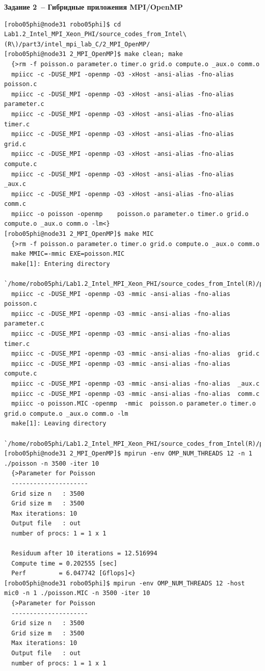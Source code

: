 \documentclass[pscyr,10pt]{hedlab}
\begin{document}
  \begin{center}
    \textbf{Задание 2~-- Гибридные приложения MPI/OpenMP}
  \end{center}

\begin{lstlisting}
[robo05phi@node31 robo05phi]$ cd Lab1.2_Intel_MPI_Xeon_PHI/source_codes_from_Intel\(R\)/part3/intel_mpi_lab_C/2_MPI_OpenMP/
[robo05phi@node31 2_MPI_OpenMP]$ make clean; make
  {>rm -f poisson.o parameter.o timer.o grid.o compute.o _aux.o comm.o
  mpiicc -c -DUSE_MPI -openmp -O3 -xHost -ansi-alias -fno-alias  poisson.c
  mpiicc -c -DUSE_MPI -openmp -O3 -xHost -ansi-alias -fno-alias  parameter.c
  mpiicc -c -DUSE_MPI -openmp -O3 -xHost -ansi-alias -fno-alias  timer.c
  mpiicc -c -DUSE_MPI -openmp -O3 -xHost -ansi-alias -fno-alias  grid.c
  mpiicc -c -DUSE_MPI -openmp -O3 -xHost -ansi-alias -fno-alias  compute.c
  mpiicc -c -DUSE_MPI -openmp -O3 -xHost -ansi-alias -fno-alias  _aux.c
  mpiicc -c -DUSE_MPI -openmp -O3 -xHost -ansi-alias -fno-alias  comm.c
  mpiicc -o poisson -openmp    poisson.o parameter.o timer.o grid.o compute.o _aux.o comm.o -lm<}
[robo05phi@node31 2_MPI_OpenMP]$ make MIC
  {>rm -f poisson.o parameter.o timer.o grid.o compute.o _aux.o comm.o
  make MMIC=-mmic EXE=poisson.MIC
  make[1]: Entering directory
   `/home/robo05phi/Lab1.2_Intel_MPI_Xeon_PHI/source_codes_from_Intel(R)/part3/intel_mpi_lab_C/2_MPI_OpenMP'
  mpiicc -c -DUSE_MPI -openmp -O3 -mmic -ansi-alias -fno-alias  poisson.c
  mpiicc -c -DUSE_MPI -openmp -O3 -mmic -ansi-alias -fno-alias  parameter.c
  mpiicc -c -DUSE_MPI -openmp -O3 -mmic -ansi-alias -fno-alias  timer.c
  mpiicc -c -DUSE_MPI -openmp -O3 -mmic -ansi-alias -fno-alias  grid.c
  mpiicc -c -DUSE_MPI -openmp -O3 -mmic -ansi-alias -fno-alias  compute.c
  mpiicc -c -DUSE_MPI -openmp -O3 -mmic -ansi-alias -fno-alias  _aux.c
  mpiicc -c -DUSE_MPI -openmp -O3 -mmic -ansi-alias -fno-alias  comm.c
  mpiicc -o poisson.MIC -openmp  -mmic  poisson.o parameter.o timer.o grid.o compute.o _aux.o comm.o -lm
  make[1]: Leaving directory 
   `/home/robo05phi/Lab1.2_Intel_MPI_Xeon_PHI/source_codes_from_Intel(R)/part3/intel_mpi_lab_C/2_MPI_OpenMP'<}
[robo05phi@node31 2_MPI_OpenMP]$ mpirun -env OMP_NUM_THREADS 12 -n 1 ./poisson -n 3500 -iter 10
  {>Parameter for Poisson
  ---------------------
  Grid size n   : 3500
  Grid size m   : 3500
  Max iterations: 10
  Output file   : out
  number of procs: 1 = 1 x 1
  
  Residuum after 10 iterations = 12.516994 
  Compute time = 0.202555 [sec]
  Perf         = 6.047742 [Gflops]<}
[robo05phi@node31 robo05phi]$ mpirun -env OMP_NUM_THREADS 12 -host mic0 -n 1 ./poisson.MIC -n 3500 -iter 10
  {>Parameter for Poisson
  ---------------------
  Grid size n   : 3500
  Grid size m   : 3500
  Max iterations: 10
  Output file   : out
  number of procs: 1 = 1 x 1
  

\end{lstlisting}
\end{document}

